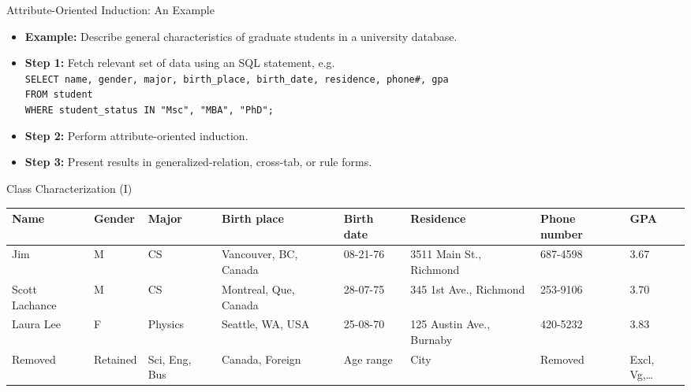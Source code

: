 \begin{frame}{Attribute-Oriented Induction: An Example}
	\begin{itemize}
		\item \textbf{Example:} Describe general characteristics of graduate students in a university database.
		\item \textbf{Step 1:} Fetch relevant set of data using an SQL statement, e.g.\\[0.1cm]
		      \texttt{SELECT name, gender, major, birth\_place, birth\_date, residence, phone\#, gpa}\\
		      \texttt{FROM student}\\
		      \texttt{WHERE student\_status IN {"Msc", "MBA", "PhD"};}\\[0.1cm]
		\item \textbf{Step 2:} Perform attribute-oriented induction.
		\item \textbf{Step 3:} Present results in generalized-relation, cross-tab, or rule forms.
	\end{itemize}
\end{frame}

\begin{frame}{Class Characterization (I)}
	\begin{table}
		\small
		\begin{tabularx}{\textwidth}{|X|X|X|X|X|X|X|X|}
			\hline
			\textbf{Name}        & \textbf{Gender}       & \textbf{Major}             & \textbf{Birth place}         & \textbf{Birth date}    & \textbf{Residence}       & \textbf{Phone number} & \textbf{GPA}                 \\\hline
			Jim                  & M                     & CS                         & Vancouver, BC, Canada        & 08-21-76               & 3511 Main St., Richmond  & 687-4598              & 3.67                         \\\hline
			Scott Lachance       & M                     & CS                         & Montreal, Que, Canada        & 28-07-75               & 345 1st Ave., Richmond   & 253-9106              & 3.70                         \\\hline
			Laura Lee            & F                     & Physics                    & Seattle, WA, USA             & 25-08-70               & 125 Austin Ave., Burnaby & 420-5232              & 3.83                         \\\hline
			{\color{red}Removed} & {\color{red}Retained} & {\color{red}Sci, Eng, Bus} & {\color{red}Canada, Foreign} & {\color{red}Age range} & {\color{red}City}        & {\color{red}Removed}  & {\color{red}Excl, Vg,\ldots} \\\hline
		\end{tabularx}
	\end{table}
\end{frame}

